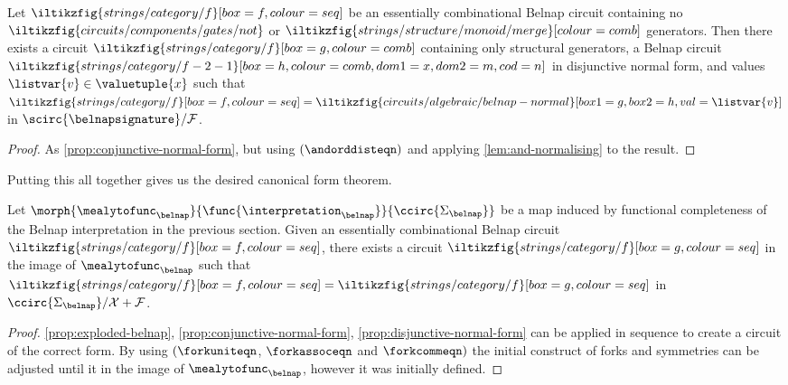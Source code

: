 \begin{proposition}\label{prop:disjunctive-normal-form}
    Let \(
    \iltikzfig{strings/category/f}[box=f,colour=seq]
    \) be an essentially combinational Belnap circuit containing no \(
    \iltikzfig{circuits/components/gates/not}
    \) or \(
    \iltikzfig{strings/structure/monoid/merge}[colour=comb]
    \) generators.
    Then there exists a circuit \(
    \iltikzfig{strings/category/f}[box=g,colour=comb]
    \) containing only structural generators, a Belnap circuit \(
    \iltikzfig{strings/category/f-2-1}[box=h,colour=comb,dom1=x,dom2=m,cod=n]
    \) in disjunctive normal form, and values \(\listvar{v} \in \valuetuple{x}\)
    such that \(
    \iltikzfig{strings/category/f}[box=f,colour=seq]
    =
    \iltikzfig{circuits/algebraic/belnap-normal}[box1=g,box2=h,val=\listvar{v}]
    \) in \(
    \scirc{\belnapsignature} / \mathcal{F}
    \).
\end{proposition}
\begin{proof}
    As \cref{prop:conjunctive-normal-form}, but using \((\andorddisteqn)\) and
    applying \cref{lem:and-normalising} to the result.
\end{proof}

Putting this all together gives us the desired canonical form theorem.

\begin{theorem}
    Let \(
    \morph{\mealytofunc_\belnap}{\func{\interpretation_{\belnap}}}{\ccirc{\Sigma_\belnap}}
    \) be a map induced by functional completeness of the Belnap interpretation
    in the previous section.
    Given an essentially combinational Belnap circuit \(
    \iltikzfig{strings/category/f}[box=f,colour=seq]
    \), there exists a circuit \(
    \iltikzfig{strings/category/f}[box=g,colour=seq]
    \) in the image of \(\mealytofunc_\belnap\) such that \(
    \iltikzfig{strings/category/f}[box=f,colour=seq]
    =
    \iltikzfig{strings/category/f}[box=g,colour=seq]
    \) in \(\ccirc{\Sigma_\belnap} / \mathcal{X} + \mathcal{F}\).
\end{theorem}
\begin{proof}
    \cref{prop:exploded-belnap}, \cref{prop:conjunctive-normal-form},
    \cref{prop:disjunctive-normal-form} can be applied in
    sequence to create a circuit of the correct form.
    By using \((\forkuniteqn\), \(\forkassoceqn\) and \(\forkcommeqn)\) the
    initial construct of forks and symmetries can be adjusted until it in the
    image of \(\mealytofunc_\belnap\), however it was initially defined.
\end{proof}
